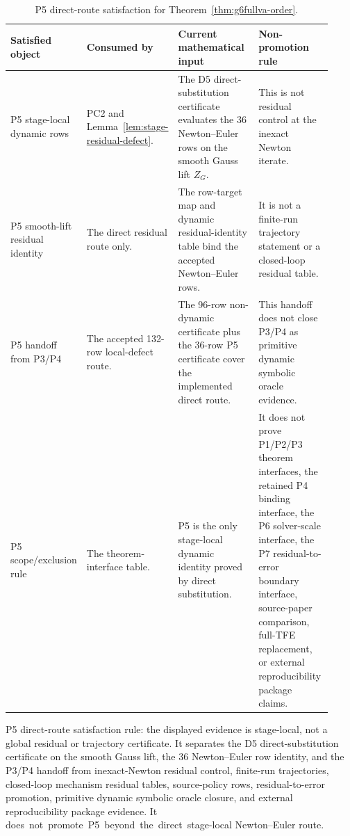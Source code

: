 \documentclass[preprint,12pt]{elsarticle}
\newcommand{\tfe}{TFE}
\begin{document}
\begin{table}[htbp]
\centering
\caption{P5 direct-route satisfaction for
Theorem~\ref{thm:g6fullva-order}.}
\label{tab:p5-direct-route-satisfaction-ledger}
\scriptsize
\setlength{\tabcolsep}{2pt}
\renewcommand{\arraystretch}{0.9}
\begin{tabular}{P{0.18\linewidth}P{0.26\linewidth}P{0.25\linewidth}P{0.23\linewidth}}
\toprule
Satisfied object & Consumed by & Current mathematical input & Non-promotion rule \\
\midrule
P5 stage-local dynamic rows &
PC2 and Lemma~\ref{lem:stage-residual-defect}. &
The D5 direct-substitution certificate evaluates the 36 Newton--Euler rows on
the smooth Gauss lift \(Z_G\). &
This is not residual control at the inexact Newton iterate. \\
P5 smooth-lift residual identity &
The direct residual route only. &
The row-target map and dynamic residual-identity table bind the accepted
Newton--Euler rows. &
It is not a finite-run trajectory statement or a closed-loop residual table. \\
P5 handoff from P3/P4 &
The accepted 132-row local-defect route. &
The 96-row non-dynamic certificate plus the 36-row P5 certificate cover the
implemented direct route. &
This handoff does not close P3/P4 as primitive dynamic symbolic oracle
evidence. \\
P5 scope/exclusion rule &
The theorem-interface table. &
P5 is the only stage-local dynamic identity proved by direct substitution. &
It does not prove P1/P2/P3 theorem interfaces, the retained P4 binding
interface, the P6 solver-scale interface, the P7 residual-to-error boundary
interface, source-paper comparison, full-\tfe{} replacement, or external
reproducibility package claims. \\
\bottomrule
\end{tabular}
\end{table}

P5 direct-route satisfaction rule: the displayed evidence is stage-local, not
a global residual or trajectory certificate. It separates the D5
direct-substitution certificate on the smooth
Gauss lift, the 36 Newton--Euler row identity, and the P3/P4 handoff from
inexact-Newton residual control, finite-run trajectories, closed-loop
mechanism residual tables, source-policy rows, residual-to-error promotion,
primitive dynamic symbolic oracle closure, and external reproducibility package
evidence. It
\mbox{does not promote P5 beyond the direct stage-local} Newton--Euler route.
\end{document}
